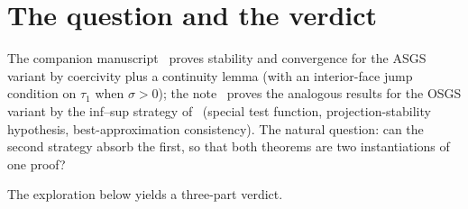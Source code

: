 \documentclass[11pt]{article}
\theoremstyle{remark}
\begin{document}
\section{The question and the verdict}
\label{sec:verdict}

The companion manuscript~\cite{companion} proves stability and convergence for the
ASGS variant by coercivity plus a continuity lemma (with an interior-face jump
condition on $\tau_1$ when $\sigma>0$); the note~\cite{OSGSnote} proves the analogous
results for the OSGS variant by the inf--sup strategy of~\cite{Codina2008}
(special test function, projection-stability hypothesis, best-approximation
consistency). The natural question: can the second strategy absorb the first, so that
both theorems are two instantiations of one proof?

The exploration below yields a three-part verdict.
\end{document}
